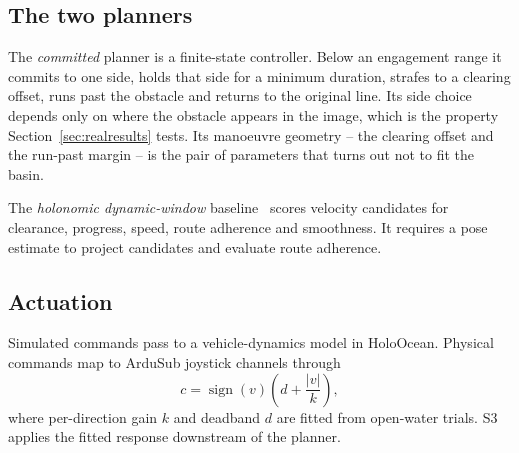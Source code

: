 \subsection{The two planners}

The \emph{committed} planner is a finite-state controller. Below an
engagement range it commits to one side, holds that side for a minimum
duration, strafes to a clearing offset, runs past the obstacle and
returns to the original line. Its side choice depends only on where the
obstacle appears in the image, which is the property
Section~\ref{sec:realresults} tests. Its manoeuvre geometry -- the
clearing offset and the run-past margin -- is the pair of parameters that
turns out not to fit the basin.

The \emph{holonomic dynamic-window} baseline~\cite{fox1997thedynam}
scores velocity candidates for clearance, progress, speed, route
adherence and smoothness. It requires a pose estimate to project
candidates and evaluate route adherence.

\subsection{Actuation}

Simulated commands pass to a vehicle-dynamics model in HoloOcean.
Physical commands map to ArduSub joystick channels through
\begin{equation}
c = \operatorname{sign}(v)\left(d + \frac{|v|}{k}\right),
\label{eq:deadband}
\end{equation}
where per-direction gain $k$ and deadband $d$ are fitted from open-water
trials. S3 applies the fitted response downstream of the planner.
